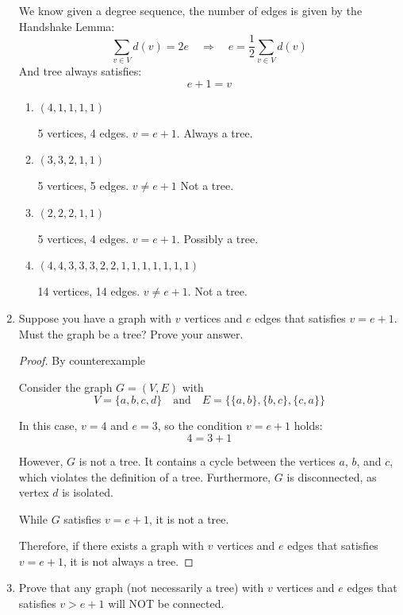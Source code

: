 \documentclass[11pt, letterpaper, includehead]{article}
\theoremstyle{plain}
\theoremstyle{mydefinition}
\theoremstyle{myproperty}
\begin{document}
\begin{enumerate}[label=\textbf{\arabic*}., leftmargin=*]
        We know given a degree sequence, the number of edges is given by the Handshake Lemma:
        \[
            \sum_{v \in V} d(v) = 2e \quad \Rightarrow \quad e = \frac{1}{2} \sum_{v \in V} d(v)
        \]
        And tree always satisfies:
        \[e + 1 = v\]

    \begin{enumerate}[label=(\alph*)]
        \item $(4, 1, 1, 1, 1)$
        
        5 vertices, 4 edges. $v = e + 1$. Always a tree. 
        \item $(3, 3, 2, 1, 1)$

        5 vertices, 5 edges. $v \neq e + 1$ Not a tree.
        \item $(2, 2, 2, 1, 1)$
        
        5 vertices, 4 edges. $v = e + 1$. Possibly a tree.
        \item $(4, 4, 3, 3, 3, 2, 2, 1, 1, 1, 1, 1, 1, 1)$

        14 vertices, 14 edges. $v \neq e + 1$. Not a tree. 
    \end{enumerate}

    \item Suppose you have a graph with $v$ vertices and $e$ edges that satisfies $v = e + 1$. Must the graph be a tree? Prove your answer.
    \begin{proof} By counterexample

        Consider the graph $G = (V, E)$ with
        \[V = \{a, b, c, d\} \quad \text{and} \quad E = \{\{a, b\}, \{b, c\}, \{c, a\}\}\]

        In this case, $v = 4$ and $e = 3$, so the condition $v = e + 1$ holds:  
        \[4 = 3 + 1\]

        However, $G$ is not a tree. It contains a cycle between the vertices $a$, $b$, and $c$, which violates the definition of a tree. Furthermore, $G$ is disconnected, as vertex $d$ is isolated.

        While $G$ satisfies $v = e + 1$, it is not a tree.

        Therefore, if there exists a graph with $v$ vertices and $e$ edges that satisfies $v = e + 1$, it is not always a tree.
    \end{proof}

    \item Prove that any graph (not necessarily a tree) with $v$ vertices and $e$ edges that satisfies $v > e + 1$ will NOT be connected.


\end{enumerate}
\end{document}
